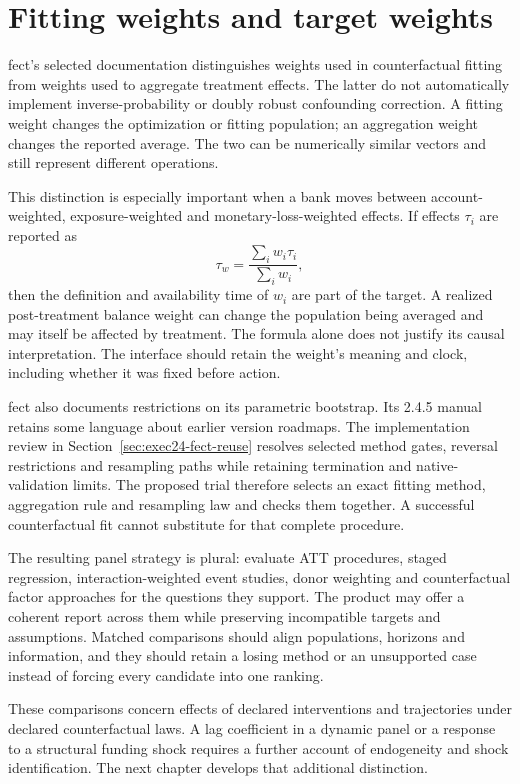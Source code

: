 

\section{Fitting weights and target weights}

fect's selected documentation distinguishes weights used in counterfactual
fitting from weights used to aggregate treatment effects. The latter do not
automatically implement inverse-probability or doubly robust confounding
correction. A fitting weight changes the optimization or fitting population;
an aggregation weight changes the reported average. The two can be numerically
similar vectors and still represent different operations. \citep{v12_sw_fect}

This distinction is especially important when a bank moves between
account-weighted, exposure-weighted and monetary-loss-weighted effects.
If effects \(\tau_i\) are reported as
\[
 \tau_w=\frac{\sum_i w_i\tau_i}{\sum_i w_i},
\]
then the definition and availability time of \(w_i\) are part of the target.
A realized post-treatment balance weight can change the population being
averaged and may itself be affected by treatment. The formula alone does not
justify its causal interpretation. The interface should retain the weight's
meaning and clock, including whether it was fixed before action.

fect also documents restrictions on its parametric bootstrap. Its 2.4.5
manual retains some language about earlier version roadmaps. The implementation
review in Section~\ref{sec:exec24-fect-reuse} resolves selected method gates,
reversal restrictions and resampling paths while retaining termination and
native-validation limits. The proposed trial therefore selects an exact fitting
method, aggregation rule and resampling law and checks them together. A
successful counterfactual fit cannot substitute for that complete procedure.

The resulting panel strategy is plural: evaluate ATT procedures, staged
regression, interaction-weighted event studies, donor weighting and
counterfactual factor approaches for the questions they support. The product
may offer a coherent report across them while preserving incompatible targets
and assumptions. Matched comparisons should align populations, horizons and
information, and they should retain a losing method or an unsupported case
instead of forcing every candidate into one ranking.

These comparisons concern effects of declared interventions and trajectories
under declared counterfactual laws. A lag coefficient in a dynamic panel or
a response to a structural funding shock requires a further account of
endogeneity and shock identification. The next chapter develops that
additional distinction.


